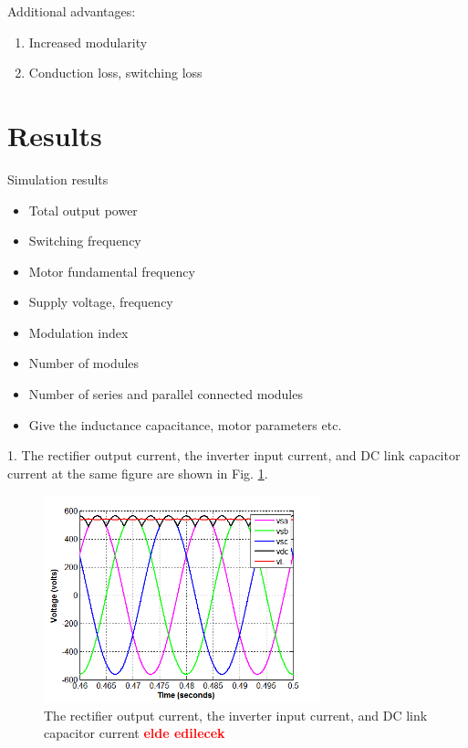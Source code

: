 \documentclass[conference,a4paper,twocolumn]{IEEEtran}
\begin{document}
Additional advantages:
\begin{enumerate}
  \item Increased modularity
  \item Conduction loss, switching loss
\end{enumerate}



\section{Results}
Simulation results

\begin{itemize}
  \item Total output power
  \item Switching frequency
  \item Motor fundamental frequency
  \item Supply voltage, frequency
  \item Modulation index
  \item Number of modules
  \item Number of series and parallel connected modules
  \item Give the inductance capacitance, motor parameters etc.
\end{itemize}

1. The rectifier output current, the inverter input current, and DC link capacitor current at the same figure are shown in Fig. \ref{fig:sample}.
\begin{figure}[h]
  \centering
  \includegraphics[width=8cm]{images/sample}
  \caption{The rectifier output current, the inverter input current, and DC link capacitor current  \textbf{\textcolor{red}{elde edilecek}}}
  \label{fig:sample}
\end{figure}
\end{document}

